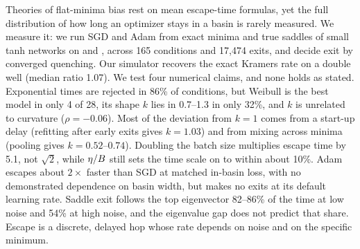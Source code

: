 Theories of flat-minima bias rest on mean escape-time formulas, yet the full distribution of how long an optimizer stays in a basin is rarely measured.
We measure it: we run SGD and Adam from exact minima and true saddles of small tanh networks on \fmnist and \digitsdata, across 165 conditions and 17,474 exits, and decide exit by converged quenching.
Our simulator recovers the exact Kramers rate on a double well (median ratio 1.07).
We test four numerical claims, and none holds as stated.
Exponential times are rejected in 86\% of conditions, but Weibull is the best model in only 4 of 28, its shape $k$ lies in 0.7--1.3 in only 32\%, and $k$ is unrelated to curvature ($\rho=-0.06$).
Most of the deviation from $k=1$ comes from a start-up delay (refitting after early exits gives $k=1.03$) and from mixing across minima (pooling gives $k=0.52$--$0.74$).
Doubling the batch size multiplies escape time by 5.1, not $\sqrt{2}$, while $\eta/B$ still sets the time scale on \fmnist to within about 10\%.
Adam escapes about $2\times$ faster than SGD at matched in-basin loss, with no demonstrated dependence on basin width, but makes no exits at its default learning rate.
Saddle exit follows the top eigenvector 82--86\% of the time at low noise and 54\% at high noise, and the eigenvalue gap does not predict that share.
Escape is a discrete, delayed hop whose rate depends on noise and on the specific minimum.
